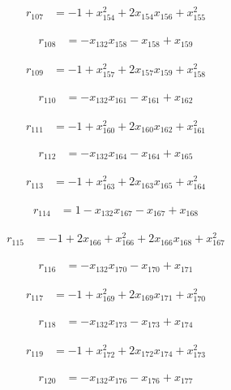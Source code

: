 \begin{align*}
r_{107}&=-1+x_{154}^{2}+2x_{154}x_{156}+x_{155}^{2}
\end{align*}

\begin{align*}
r_{108}&=-x_{132}x_{158}-x_{158}+x_{159}
\end{align*}

\begin{align*}
r_{109}&=-1+x_{157}^{2}+2x_{157}x_{159}+x_{158}^{2}
\end{align*}

\begin{align*}
r_{110}&=-x_{132}x_{161}-x_{161}+x_{162}
\end{align*}

\begin{align*}
r_{111}&=-1+x_{160}^{2}+2x_{160}x_{162}+x_{161}^{2}
\end{align*}

\begin{align*}
r_{112}&=-x_{132}x_{164}-x_{164}+x_{165}
\end{align*}

\begin{align*}
r_{113}&=-1+x_{163}^{2}+2x_{163}x_{165}+x_{164}^{2}
\end{align*}

\begin{align*}
r_{114}&=1-x_{132}x_{167}-x_{167}+x_{168}
\end{align*}

\begin{align*}
r_{115}&=-1+2x_{166}+x_{166}^{2}+2x_{166}x_{168}+x_{167}^{2}
\end{align*}

\begin{align*}
r_{116}&=-x_{132}x_{170}-x_{170}+x_{171}
\end{align*}

\begin{align*}
r_{117}&=-1+x_{169}^{2}+2x_{169}x_{171}+x_{170}^{2}
\end{align*}

\begin{align*}
r_{118}&=-x_{132}x_{173}-x_{173}+x_{174}
\end{align*}

\begin{align*}
r_{119}&=-1+x_{172}^{2}+2x_{172}x_{174}+x_{173}^{2}
\end{align*}

\begin{align*}
r_{120}&=-x_{132}x_{176}-x_{176}+x_{177}
\end{align*}

